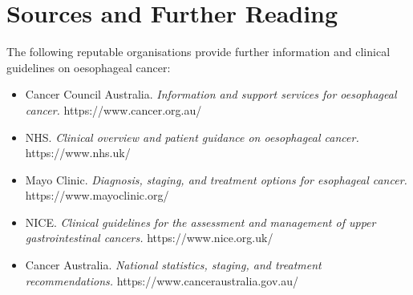 \section*{Sources and Further Reading}
The following reputable organisations provide further information and clinical guidelines on oesophageal cancer:
\begin{itemize}
    \item Cancer Council Australia. \textit{Information and support services for oesophageal cancer.} https://www.cancer.org.au/
    \item NHS. \textit{Clinical overview and patient guidance on oesophageal cancer.} https://www.nhs.uk/
    \item Mayo Clinic. \textit{Diagnosis, staging, and treatment options for esophageal cancer.} https://www.mayoclinic.org/
    \item NICE. \textit{Clinical guidelines for the assessment and management of upper gastrointestinal cancers.} https://www.nice.org.uk/
    \item Cancer Australia. \textit{National statistics, staging, and treatment recommendations.} https://www.canceraustralia.gov.au/
\end{itemize}
